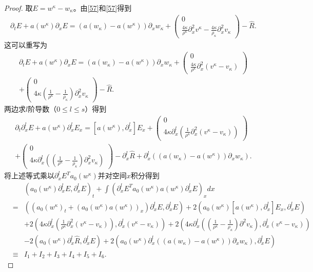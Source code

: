 \begin{proof}
取$E = w^\kappa - w_\kappa$。由\eqref{57}和\eqref{57}得到
\begin{eqnarray*}
  \partial_t E + a(w^\kappa) \partial_x E = (a(w_\kappa) - a(w^\kappa)) \partial_x w_\kappa + \left( \begin{array}{cc} 0 \\ \frac{4\kappa}{\rho^\kappa} \partial^2_x v^\kappa - \frac{4\kappa}{\rho_\kappa} \partial^2_x v_\kappa \end{array} \right) - \hat{R}.
\end{eqnarray*}
这可以重写为
\begin{eqnarray*}
   \partial_t E + a(w^\kappa) \partial_x E = (a(w_\kappa) - a(w^\kappa)) \partial_x w_\kappa + \left( \begin{array}{cc} 0 \\ \frac{4\kappa}{\rho^\kappa} \partial^2_x (v^\kappa - v_\kappa) \end{array} \right) \\
   + \left( \begin{array}{cc} 0 \\ 4\kappa(\frac{1}{\rho^\kappa} -\frac{1}{ \rho_\kappa})\partial^2_x v_\kappa \end{array} \right)- \hat{R}.
\end{eqnarray*}
两边求$l$阶导数（$0 \le l \le s$）得到
\begin{eqnarray*}
  \partial_t \partial^l_x E + a(w^\kappa) \partial^l_x E_x  = [a(w^\kappa),\partial^l_x] E_x  + \left( \begin{array}{cc} 0 \\4\kappa \partial^l_x(\frac{1}{\rho^\kappa} \partial^2_x (v^\kappa-v_\kappa)) \end{array} \right) \\  + \left( \begin{array}{cc} 0 \\ 4 \kappa \partial^l_x ((\frac{1}{\rho^\kappa} - \frac{1}{\rho_\kappa}) \partial^2_x v_\kappa) \end{array} \right) -\partial^l_x \hat{R} + \partial^l_x ((a(w_\kappa)-a(w^\kappa))\partial_x w_\kappa).
\end{eqnarray*}
将上述等式乘以$\partial^l_x E^Ta_0(w^\kappa)$并对空间$x$积分得到
\begin{eqnarray}\label{58}
&& (a_0(w^\kappa) \partial^l_x E,\partial^l_x E)_t + \int ( \partial^l_x E^T a_0(w^\kappa) a(w^\kappa) \partial^l_x E )_x dx \nonumber \\
&=&  ((a_0(w^\kappa)_t + (a_0(w^\kappa)a(w^\kappa))_x) \partial^l_x E,\partial^l_x E)
+ 2(a_0(w^\kappa)[a(w^\kappa),\partial^l_x] E_x,\partial^l_x E)\nonumber \\
&& + 2 (4\kappa \partial^l_x (\frac{1}{\rho^\kappa} \partial^2_x (v^\kappa-v_\kappa)),\partial^l_x (v^\kappa-v_\kappa)) + 2(4\kappa \partial^l_x ( (\frac{1}{\rho^\kappa}-\frac{1}{\rho_\kappa})\partial^2 v_\kappa),\partial^l_x (v^\kappa-v_\kappa)) \nonumber\\
&& - 2(a_0(w^\kappa)\partial^l_x\hat{R},\partial^l_x E)+ 2(a_0(w^\kappa)\partial^l_x((a(w_\kappa)-a(w^\kappa))\partial_x w_\kappa),\partial^l_x E) \nonumber \\
& \equiv& I_1 +I_2 +I_3 +I_4+I_5 + I_6.
\end{eqnarray}


\end{proof}
